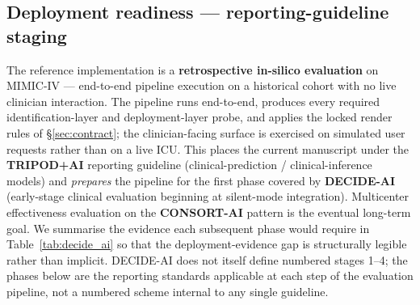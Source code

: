 \documentclass[11pt,a4paper]{article}
\begin{document}
\subsection{Deployment readiness --- reporting-guideline staging}\label{sec:deployment_readiness}

The reference implementation is a \textbf{retrospective in-silico evaluation} on MIMIC-IV --- end-to-end pipeline execution on a historical cohort with no live clinician interaction. The pipeline runs end-to-end, produces every required identification-layer and deployment-layer probe, and applies the locked render rules of \S\ref{sec:contract}; the clinician-facing surface is exercised on simulated user requests rather than on a live ICU. This places the current manuscript under the \textbf{TRIPOD+AI} \cite{tripodai2024} reporting guideline (clinical-prediction / clinical-inference models) and \emph{prepares} the pipeline for the first phase covered by \textbf{DECIDE-AI} \cite{decideai2022} (early-stage clinical evaluation beginning at silent-mode integration). Multicenter effectiveness evaluation on the \textbf{CONSORT-AI} \cite{consortai2020} pattern is the eventual long-term goal. We summarise the evidence each subsequent phase would require in Table~\ref{tab:decide_ai} so that the deployment-evidence gap is structurally legible rather than implicit. DECIDE-AI does not itself define numbered stages 1--4; the phases below are the reporting standards applicable at each step of the evaluation pipeline, not a numbered scheme internal to any single guideline.
\end{document}

